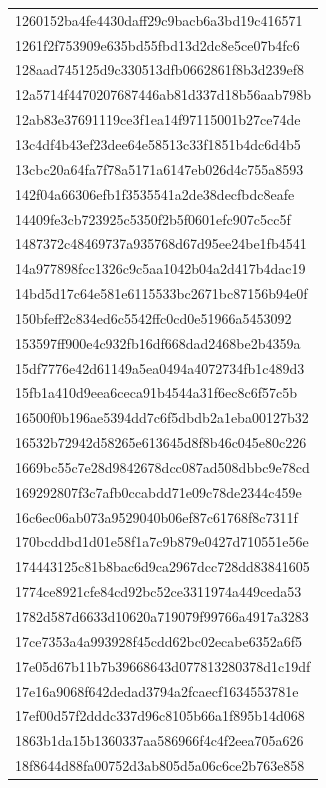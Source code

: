 \begin{tabular}{l}
1260152ba4fe4430daff29c9bacb6a3bd19c416571 \\
1261f2f753909e635bd55fbd13d2dc8e5ce07b4fc6 \\
128aad745125d9c330513dfb0662861f8b3d239ef8 \\
12a5714f4470207687446ab81d337d18b56aab798b \\
12ab83e37691119ce3f1ea14f97115001b27ce74de \\
13c4df4b43ef23dee64e58513c33f1851b4dc6d4b5 \\
13cbc20a64fa7f78a5171a6147eb026d4c755a8593 \\
142f04a66306efb1f3535541a2de38decfbdc8eafe \\
14409fe3cb723925c5350f2b5f0601efc907c5cc5f \\
1487372c48469737a935768d67d95ee24be1fb4541 \\
14a977898fcc1326c9c5aa1042b04a2d417b4dac19 \\
14bd5d17c64e581e6115533bc2671bc87156b94e0f \\
150bfeff2c834ed6c5542ffc0cd0e51966a5453092 \\
153597ff900e4c932fb16df668dad2468be2b4359a \\
15df7776e42d61149a5ea0494a4072734fb1c489d3 \\
15fb1a410d9eea6ceca91b4544a31f6ec8c6f57c5b \\
16500f0b196ae5394dd7c6f5dbdb2a1eba00127b32 \\
16532b72942d58265e613645d8f8b46c045e80c226 \\
1669bc55c7e28d9842678dcc087ad508dbbc9e78cd \\
169292807f3c7afb0ccabdd71e09c78de2344c459e \\
16c6ec06ab073a9529040b06ef87c61768f8c7311f \\
170bcddbd1d01e58f1a7c9b879e0427d710551e56e \\
174443125c81b8bac6d9ca2967dcc728dd83841605 \\
1774ce8921cfe84cd92bc52ce3311974a449ceda53 \\
1782d587d6633d10620a719079f99766a4917a3283 \\
17ce7353a4a993928f45cdd62bc02ecabe6352a6f5 \\
17e05d67b11b7b39668643d077813280378d1c19df \\
17e16a9068f642dedad3794a2fcaecf1634553781e \\
17ef00d57f2dddc337d96c8105b66a1f895b14d068 \\
1863b1da15b1360337aa586966f4c4f2eea705a626 \\
18f8644d88fa00752d3ab805d5a06c6ce2b763e858 \\

\end{tabular}
